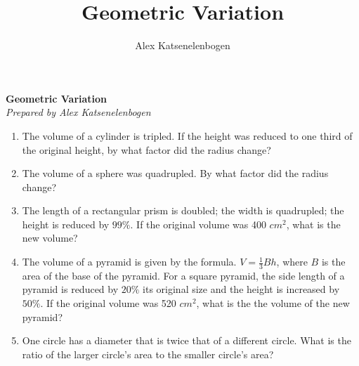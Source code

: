 \documentclass{article}
\title{Geometric Variation}
\author{Alex Katsenelenbogen}
\begin{document}
\begin{center}
      \Large\textbf{Geometric Variation}\\
      \large\textit{Prepared by Alex Katsenelenbogen}
   \end{center}

\begin{enumerate}

\item
The volume of a cylinder is tripled. If the height was reduced to one third of the original height, by what factor did the radius change?

\item 
The volume of a sphere was quadrupled. By what factor did the radius change?

\item
The length of a rectangular prism is doubled; the width is quadrupled; the height is reduced by $99\%$. If the original volume was 400 $cm^2$, what is the new volume?

\item 
The volume of a pyramid is given by the formula.  $V=\frac{1}{3}Bh$, where $B$ is the area of the base of the pyramid. For a square pyramid, the side length of a pyramid is reduced by $20\%$ its original size and the height is increased by $50\%$. If the original volume was 520 $cm^2$, what is the the volume of the new pyramid?

\item 
One circle has a diameter that is twice that of a different circle. What is the ratio of the larger circle's area to the smaller circle's area?

\end{enumerate}
\end{document}
